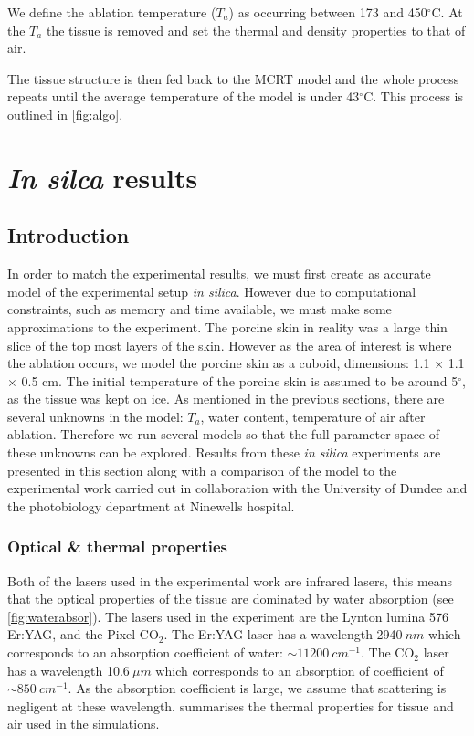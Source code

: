 We define the ablation temperature ($T_a$) as occurring between 173 and 450$^{\circ}$C\cite{gerstmann1994char}. At the $T_a$ the tissue is removed and set the thermal and density properties to that of air.

The tissue structure is then fed back to the MCRT model and the whole process repeats until the average temperature of the model is under 43$^{\circ}$C. This process is outlined in \cref{fig:algo}.

\section{\textit{In silca} results} 

\subsection{Introduction}

In order to match the experimental results, we must first create as accurate model of the experimental setup \textit{in silica}. However due to computational constraints, such as memory and time available, we must make some approximations to the experiment. The porcine skin in reality was a large thin slice of the top most layers of the skin. However as the area of interest is where the ablation occurs, we model the porcine skin as a cuboid, dimensions: 1.1 $\times$ 1.1 $\times$ 0.5 cm. The initial temperature of the porcine skin is assumed to be around 5$^{\circ}$, as the tissue was kept on ice. 
As mentioned in the previous sections, there are several unknowns in the model: $T_a$, water content, temperature of air after ablation. Therefore we run several models so that the full parameter space of these unknowns can be explored.
Results from these \textit{in silica} experiments are presented in this section along with a comparison of the model to the experimental work carried out in collaboration with the University of Dundee and the photobiology department at Ninewells hospital.


\subsubsection{Optical \& thermal properties}

Both of the lasers used in the experimental work are infrared lasers, this means that the optical properties of the tissue are dominated by water absorption (see \cref{fig:waterabsor}). The lasers used in the experiment are the Lynton lumina 576 Er:YAG, and the Pixel CO$_2$. The Er:YAG laser has a wavelength 2940$~nm$ which corresponds to an absorption coefficient of water: $\sim 11200~cm^{-1}$. The CO$_2$ laser has a wavelength 10.6$~\mu m$ which corresponds to an absorption of coefficient of $\sim 850~cm^{-1}$. As the absorption coefficient is large, we assume that scattering is negligent at these wavelength.
 summarises the thermal properties for tissue and air used in the simulations.  

